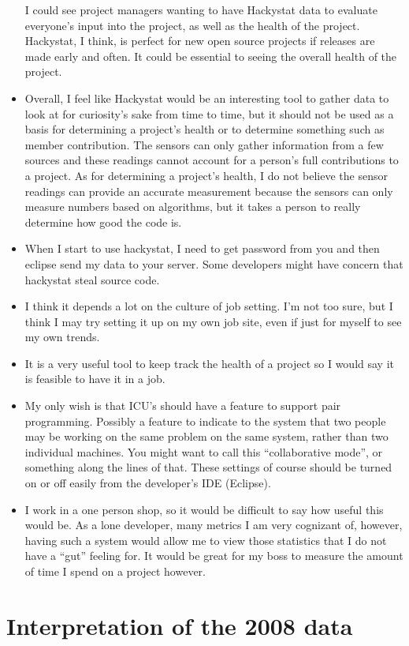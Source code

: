 \documentclass[11pt]{article}
\begin{document}
\begin{itemize}
I could see project managers wanting to have Hackystat data to evaluate everyone's input into the project, as well as the health of the project. Hackystat, I think, is perfect for new open source projects if releases are made early and often. It could be essential to seeing the overall health of the project.
\item Overall, I feel like Hackystat would be an interesting tool to gather data to look at for curiosity's sake from time to time, but it should not be used as a basis for determining a project's health or to determine something such as member contribution. The sensors can only gather information from a few sources and these readings cannot account for a person's full contributions to a project. As for determining a project's health, I do not believe the sensor readings can provide an accurate measurement because the sensors can only measure numbers based on algorithms, but it takes a person to really determine how good the code is.
\item When I start to use hackystat, I need to get password from you and then eclipse send my data to your server. Some developers might have concern that hackystat steal source code.
\item I think it depends a lot on the culture of job setting.  I'm not too sure, but I think I may try setting it up on my own job site, even if just for myself to see my own trends.
\item It is a very useful tool to keep track the health of a project so I would say it is feasible to have it in a job.
\item My only wish is that ICU's should have a feature to support pair programming. Possibly a feature to indicate to the system that two people may be working on the same problem on the same system, rather than two individual machines. You might want to call this ``collaborative mode'', or something along the lines of that. These settings of course should be turned on or off easily from the developer's IDE (Eclipse).  
\item I work in a one person shop, so it would be difficult to say how useful this would be.  As a lone developer, many metrics I am very cognizant of, however, having such a system would allow me to view those statistics that I do not have a ``gut'' feeling for.  It would be great for my boss to measure the amount of time I spend on a project however.
\end{itemize}
   
\section{Interpretation of the 2008 data}
\end{document}
